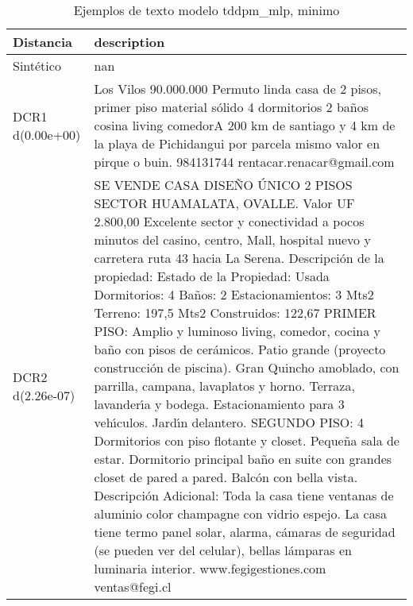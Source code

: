 \begin{table}[H]
\centering
\fontsize{10}{14}\selectfont
\caption{Ejemplos de texto modelo tddpm\_mlp, minimo}
\label{table-example-economicos-a-2-tddpm_mlp-min-text}
\begin{tabular}{|l|m{35em}|}
\hline
\rowcolor[gray]{0.8}
Distancia & description \\
\hline Sintético & nan \\
\hline DCR1 d(0.00e+00) & Los Vilos 90.000.000 Permuto linda casa de 2 pisos, primer piso material s\'olido 4 dormitorios 2 ba\~nos cosina living comedorA 200 km de santiago y 4 km de la playa de Pichidangui por parcela mismo valor en pirque o buin.  984131744 rentacar.renacar@gmail.com \\
\hline DCR2 d(2.26e-07) & SE VENDE CASA DISE\~NO \'UNICO 2 PISOS SECTOR HUAMALATA, OVALLE. Valor UF 2.800,00 Excelente sector y conectividad a pocos minutos del casino, centro, Mall, hospital nuevo y carretera ruta 43 hacia La Serena. Descripci\'on de la propiedad: Estado de la Propiedad: Usada Dormitorios: 4 Ba\~nos: 2 Estacionamientos: 3 Mts2 Terreno: 197,5 Mts2 Construidos: 122,67 PRIMER PISO: Amplio y luminoso living, comedor, cocina y ba\~no con pisos de cer\'amicos. Patio grande (proyecto construcci\'on de piscina). Gran Quincho amoblado, con parrilla, campana, lavaplatos y horno. Terraza, lavander{\'\i}a y bodega. Estacionamiento para 3 veh{\'\i}culos. Jard{\'\i}n delantero. SEGUNDO PISO: 4 Dormitorios con piso flotante y closet. Peque\~na sala de estar. Dormitorio principal ba\~no en suite con grandes closet de pared a pared. Balc\'on con bella vista. Descripci\'on Adicional: Toda la casa tiene ventanas de aluminio color champagne con vidrio espejo. La casa tiene termo panel solar, alarma, c\'amaras de seguridad (se pueden ver del celular), bellas l\'amparas en luminaria interior.   www.fegigestiones.com ventas@fegi.cl \\
\hline
\end{tabular}
\end{table}
